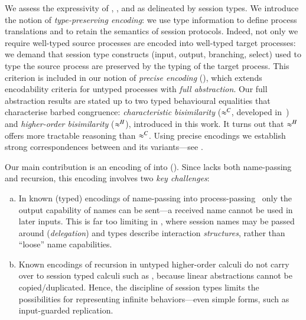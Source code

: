 We assess the expressivity  of \HOp, \HO, and \sessp as delineated by session types. 
We introduce the notion of \emph{type-preserving encoding}:
we use type information to define process translations
and to retain the semantics of session protocols. 
Indeed,  not only we require 
well-typed source processes are encoded into 
well-typed target processes: 
we demand that session type constructs (input, output, branching, select) used to type the source process
are preserved by the typing of the target process.
This criterion is included in 
our notion of \emph{precise encoding} (), which 
extends encodability criteria for untyped processes with 
\emph{full abstraction}.
{Our full abstraction results are stated
up to two
typed behavioural equalities that characterise barbed congruence:
\emph{characteristic bisimilarity} ($\approx^C$, developed in~\cite{characteristic_bis})
and 
\emph{higher-order bisimilarity} ($\approx^H$), introduced in this
work.
It turns out that $\approx^H$ offers more tractable reasoning than $\approx^C$. }
Using precise encodings we establish strong correspondences between 
\HOp and its variants---see . 



Our main contribution is 
an encoding of \HOp into \HO ().  
Since \HO lacks 
both name-passing and recursion, this encoding involves two \emph{key challenges}:
\begin{enumerate}[a.]
\item In known (typed) 
encodings of name-passing into process-passing~\cite{SaWabook} %
only the output capability of names can be sent---a received name cannot be used in later inputs.
This is far too limiting in \HOp, where 
 session names %
 may be passed around (\emph{delegation})
and types describe interaction  \emph{structures}, rather than ``loose'' name capabilities. %



\item %
Known encodings of recursion in untyped higher-order calculi
do not carry over to session typed calculi such as \HOp,
because linear abstractions cannot be copied/duplicated. Hence, the discipline of session types  limits 
the possibilities for representing infinite behaviors---even simple forms, such as input-guarded replication.
\end{enumerate}




